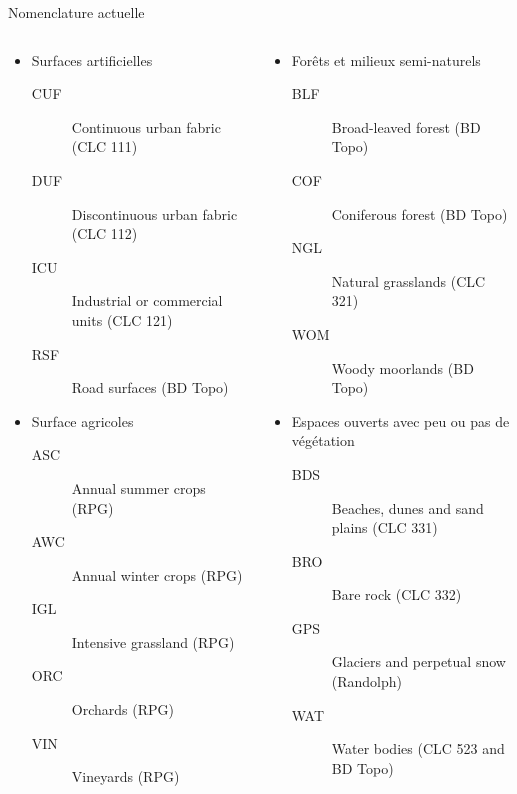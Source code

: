 \documentclass[pressentation,10pt,aspectratio=1610, xcolor=table]{beamer}
\begin{document}
\begin{frame}[label={sec:org612831b}]{Nomenclature actuelle}
\begin{columns}
\begin{column}{0.5\columnwidth}
\small
\begin{itemize}
\item Surfaces artificielles
\begin{description}
\item[{CUF}] Continuous urban fabric (CLC 111)
\item[{DUF}] Discontinuous urban fabric (CLC 112)
\item[{ICU}] Industrial or commercial units (CLC 121)
\item[{RSF}] Road surfaces (BD Topo)
\end{description}
\item Surface agricoles
\begin{description}
\item[{ASC}] Annual summer crops (RPG)
\item[{AWC}] Annual winter crops (RPG)
\item[{IGL}] Intensive grassland (RPG)
\item[{ORC}] Orchards (RPG)
\item[{VIN}] Vineyards (RPG)
\end{description}
\end{itemize}
\end{column}
\begin{column}{0.5\columnwidth}
\small
\begin{itemize}
\item Forêts et milieux semi-naturels
\begin{description}
\item[{BLF}] Broad-leaved forest (BD Topo)
\item[{COF}] Coniferous forest (BD Topo)
\item[{NGL}] Natural grasslands (CLC 321)
\item[{WOM}] Woody moorlands (BD Topo)
\end{description}
\item Espaces ouverts avec peu ou pas de végétation
\begin{description}
\item[{BDS}] Beaches, dunes and sand plains (CLC 331)
\item[{BRO}] Bare rock (CLC 332)
\item[{GPS}] Glaciers and perpetual snow (Randolph)
\item[{WAT}] Water bodies (CLC 523 and BD Topo)
\end{description}
\end{itemize}
\end{column}
\end{columns}
\end{frame}
\end{document}
